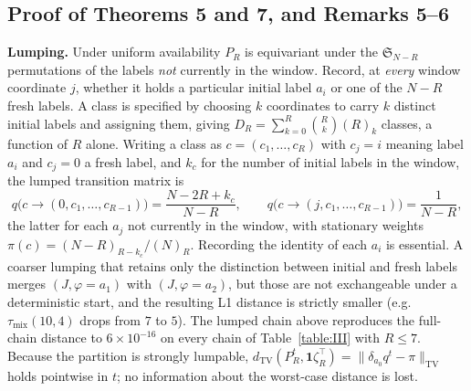 \documentclass[twoside,11pt]{article}
\begin{document}
\subsection{Proof of Theorems 5 and 7, and Remarks 5--6}
\textbf{Lumping.} Under uniform availability $P_R$ is equivariant under the
$\mathfrak{S}_{N-R}$ permutations of the labels \emph{not} currently in the window.
Record, at \emph{every} window coordinate $j$, whether it holds a particular
initial label $a_i$ or one of the $N-R$ fresh labels. A class is specified by
choosing $k$ coordinates to carry $k$ distinct initial labels and assigning
them, giving
$D_R=\sum_{k=0}^{R}\binom{R}{k}(R)_k$ classes, a function of $R$ alone.
Writing a class as $c=(c_1,\dots,c_R)$ with $c_j=i$ meaning label $a_i$ and
$c_j=0$ a fresh label, and $k_c$ for the number of initial labels in the
window, the lumped transition matrix is
\begin{equation}\label{eq:e44}
q\big(c\to(0,c_1,\dots,c_{R-1})\big)=\dfrac{N-2R+k_c}{N-R},\qquad q\big(c\to(j,c_1,\dots,c_{R-1})\big)=\dfrac{1}{N-R},
\end{equation}
the latter for each $a_j$ not currently in the window, with stationary
weights $\pi(c)=(N-R)_{R-k_c}/(N)_R$. Recording the identity of each
$a_i$ is essential. A coarser lumping that retains only the distinction between initial and fresh labels
merges $(J,\varphi{=}a_1)$ with $(J,\varphi{=}a_2)$, but those are not
exchangeable under a deterministic start, and the resulting L1 distance is
strictly smaller (e.g.\ $\tau_{\mathrm{mix}}(10,4)$ drops from $7$ to $5$).
The lumped chain above reproduces the full-chain distance to
$6\times10^{-16}$ on every chain of Table~\ref{table:III} with $R\leq7$. Because the partition is
strongly lumpable,
$d_{\mathrm{TV}}(P_R^{t},\mathbf{1}\zeta_R^{\top})
=\|\delta_{a_0}q^{t}-\pi\|_{\mathrm{TV}}$ holds pointwise in $t$; no
information about the worst-case distance is lost.
\end{document}
